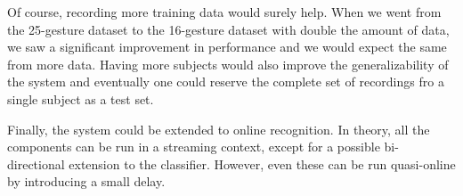 Of course, recording more training data would surely help. When we went from the
25-gesture dataset to the 16-gesture dataset with double the amount of data, we
saw a significant improvement in performance and we would expect the same from
more data. Having more subjects would also improve the generalizability of the
system and eventually one could reserve the complete set of recordings fro a
single subject as a test set.

Finally, the system could be extended to online recognition. In theory, all the
components can be run in a streaming context, except for a possible
bi-directional extension to the classifier. However, even these can be run
quasi-online by introducing a small delay.
